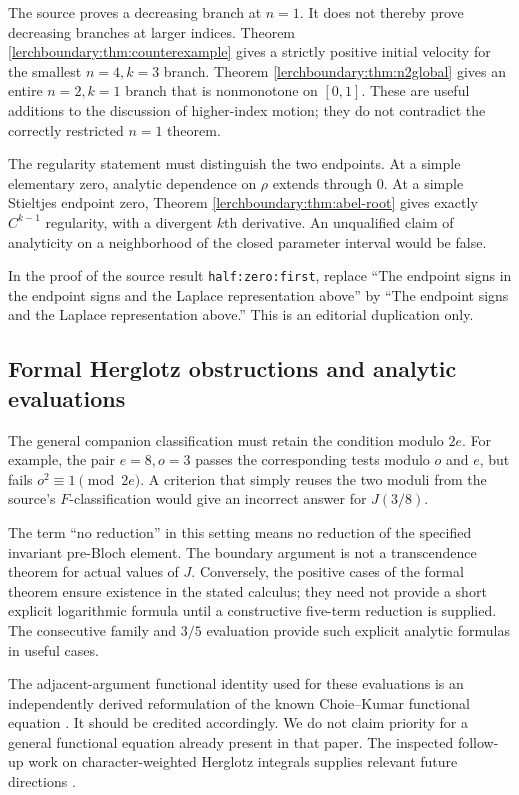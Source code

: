 \documentclass[11pt,a4paper]{article}
\theoremstyle{definition}
\theoremstyle{remark}
\numberwithin{equation}{section}
\begin{document}
The source proves a decreasing branch at $n=1$. It does not thereby
prove decreasing branches at larger indices. Theorem
\ref{lerchboundary:thm:counterexample} gives a strictly positive initial
velocity for the smallest $n=4,k=3$ branch. Theorem
\ref{lerchboundary:thm:n2global} gives an entire $n=2,k=1$ branch that
is nonmonotone on $[0,1]$. These are useful additions to the discussion
of higher-index motion; they do not contradict the correctly restricted
$n=1$ theorem.

The regularity statement must distinguish the two endpoints. At a
simple elementary zero, analytic dependence on $\rho$ extends through
$0$. At a simple Stieltjes endpoint zero, Theorem
\ref{lerchboundary:thm:abel-root} gives exactly $C^{k-1}$ regularity,
with a divergent $k$th derivative. An unqualified claim of analyticity
on a neighborhood of the closed parameter interval would be false.

In the proof of the source result \texttt{half:zero:first}, replace
``The endpoint signs in the endpoint signs and the Laplace representation
above'' by ``The endpoint signs and the Laplace representation above.''
This is an editorial duplication only.

\subsection{Formal Herglotz obstructions and analytic evaluations}

The general companion classification must retain the condition modulo
$2e$. For example, the pair $e=8,o=3$ passes the corresponding tests
modulo $o$ and $e$, but fails $o^2\equiv1\pmod{2e}$. A criterion that
simply reuses the two moduli from the source's $F$-classification would
give an incorrect answer for $J(3/8)$.

The term ``no reduction'' in this setting means no reduction of the
specified invariant pre-Bloch element. The boundary argument is not
a transcendence theorem for actual values of $J$. Conversely, the
positive cases of the formal theorem ensure existence in the stated
calculus; they need not provide a short explicit logarithmic formula
until a constructive five-term reduction is supplied. The consecutive
family and $3/5$ evaluation provide such explicit analytic formulas
in useful cases.

The adjacent-argument functional identity used for these evaluations
is an independently derived reformulation of the known Choie--Kumar
functional equation \cite[Theorem 3.2(1)]{ChoieKumar2023}. It should be
credited accordingly. We do not claim priority for a general functional
equation already present in that paper. The inspected follow-up work
on character-weighted Herglotz integrals supplies relevant future
directions \cite{DixitSathyanarayanaSharan2024}.
\end{document}
